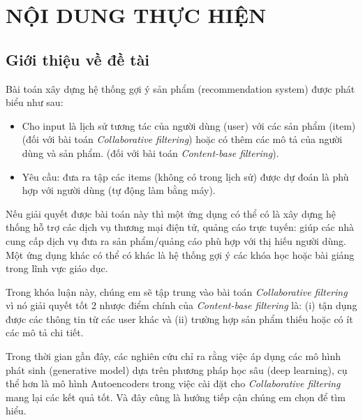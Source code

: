 \documentclass{article}[14pt]
\begin{document}
    \section{NỘI DUNG THỰC HIỆN}
    {

    
    \subsection{Giới thiệu về đề tài}
    
    
      Bài toán xây dựng hệ thống gợi ý sản phẩm (recommendation system) được phát biểu như sau:
      \begin{itemize}
          \item Cho input là lịch sử tương tác của người dùng (user)  với 
          các sản phẩm (item) (đối với bài toán \textit{Collaborative filtering}) 
          hoặc có thêm các mô tả của người dùng và sản phẩm. 
          (đối với bài toán \textit{Content-base filtering}).
          \item Yêu cầu: đưa ra tập các items (không có trong lịch sử) 
          được dự đoán là phù hợp với người dùng (tự động làm bằng máy).
      \end{itemize}
      Nếu giải quyết được bài toán này thì một ứng dụng có thể có là xây dựng 
      hệ thống hỗ trợ các dịch vụ thương mại điện tử, quảng cáo trực tuyến: 
      giúp các nhà cung cấp dịch vụ đưa ra sản phẩm/quảng cáo phù hợp với 
      thị hiếu người dùng. Một ứng dụng khác có thể có khác là hệ thống gợi ý các 
      khóa học hoặc bài giảng trong lĩnh vực giáo dục.

      Trong khóa luận này, chúng em sẽ tập trung vào bài toán 
      \textit{Collaborative filtering} vì nó giải quyết tốt 2 nhược điểm chính 
      của \textit{Content-base filtering} là: 
      (i) tận dụng được các thông tin từ các user khác và 
      (ii) trường hợp sản phẩm thiếu hoặc có ít các mô tả chi tiết.
      
      Trong thời gian gần đây, các nghiên cứu chỉ ra rằng việc áp dụng các 
      mô hình phát sinh (generative model) dựa trên phương pháp học sâu 
      (deep learning), cụ thể hơn là mô hình Autoencoders trong việc cài đặt cho 
      \textit{Collaborative filtering} mang lại các kết quả tốt. 
      Và đây cũng là hướng tiếp cận chúng em chọn để tìm hiểu.

}
\end{document}
